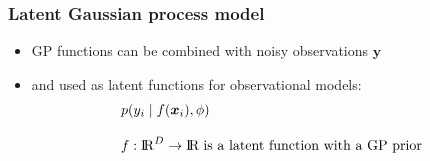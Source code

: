 \documentclass[8pt]{beamer} %
\begin{document}
\begin{frame}
\vspace{2mm}
\end{frame}

\begin{frame}[t]\frametitle{\normalsize Latent Gaussian process model}

\begin{itemize}\setlength\itemsep{2mm}
\item GP functions can be combined with noisy observations $\bm{y}$
\item and used as {\color{navyblue} latent functions} for observational models:
%
\vspace{2mm}
\begin{align*}
&{\Large p(y_i \mid f(\bm{x}_i),\phi)}\\[3mm]
&f:{\rm I\!R}^D \to {\rm I\!R}\; \text{is a latent function with a GP prior}
\end{align*}

\end{itemize}
\end{frame}
\end{document}
